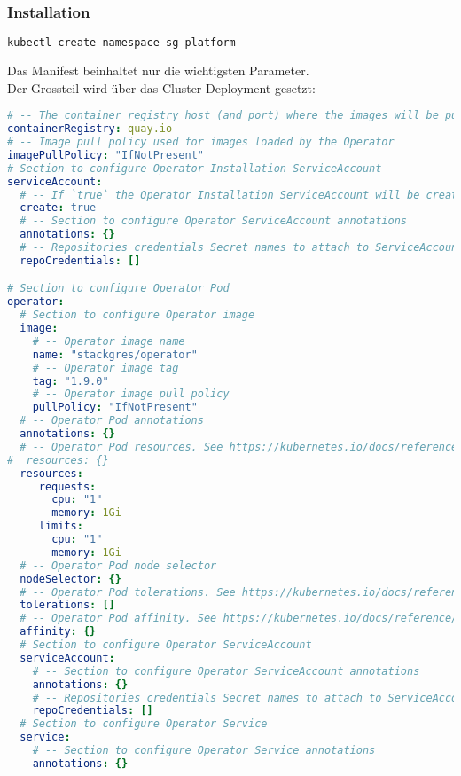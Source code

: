 \subsubsection{Installation}
\lstset{style=gra_codestyle}
\begin{lstlisting}[language=bash, caption=StackGres-Citus - Namespace,captionpos=b,label={lst:stackgres-citus-namespace},breaklines=true]
kubectl create namespace sg-platform
\end{lstlisting}

Das Manifest beinhaltet nur die wichtigsten Parameter.\\
Der Grossteil wird über das Cluster-Deployment gesetzt:
\lstset{style=gra_codestyle}
\begin{lstlisting}[language=yaml, caption=StackGres-Citus - Helm Chart Manifest,captionpos=b,label={lst:stackgres_citus-values.yaml},breaklines=true]
# -- The container registry host (and port) where the images will be pulled from.
containerRegistry: quay.io
# -- Image pull policy used for images loaded by the Operator
imagePullPolicy: "IfNotPresent"
# Section to configure Operator Installation ServiceAccount
serviceAccount:
  # -- If `true` the Operator Installation ServiceAccount will be created
  create: true
  # -- Section to configure Operator ServiceAccount annotations
  annotations: {}
  # -- Repositories credentials Secret names to attach to ServiceAccounts and Pods
  repoCredentials: []

# Section to configure Operator Pod
operator:
  # Section to configure Operator image
  image:
    # -- Operator image name
    name: "stackgres/operator"
    # -- Operator image tag
    tag: "1.9.0"
    # -- Operator image pull policy
    pullPolicy: "IfNotPresent"
  # -- Operator Pod annotations
  annotations: {}
  # -- Operator Pod resources. See https://kubernetes.io/docs/reference/generated/kubernetes-api/v1.27/#resourcerequirements-v1-core
#  resources: {}
  resources:
     requests:
       cpu: "1"
       memory: 1Gi
     limits:
       cpu: "1"
       memory: 1Gi
  # -- Operator Pod node selector
  nodeSelector: {}
  # -- Operator Pod tolerations. See https://kubernetes.io/docs/reference/generated/kubernetes-api/v1.27/#toleration-v1-core
  tolerations: []
  # -- Operator Pod affinity. See https://kubernetes.io/docs/reference/generated/kubernetes-api/v1.27/#affinity-v1-core
  affinity: {}
  # Section to configure Operator ServiceAccount
  serviceAccount:
    # -- Section to configure Operator ServiceAccount annotations
    annotations: {}
    # -- Repositories credentials Secret names to attach to ServiceAccounts and Pods
    repoCredentials: []
  # Section to configure Operator Service
  service:
    # -- Section to configure Operator Service annotations
    annotations: {}


\end{lstlisting}
